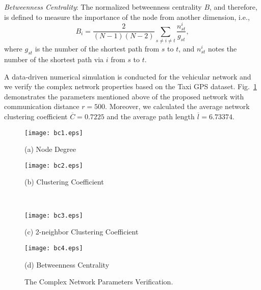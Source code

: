 \documentclass[journal,12pt,draftclsnofoot,onecolumn]{IEEEtran}
\begin{document}
\emph{Betweenness Centrality}: The normalized betweenness centrality $B$, and therefore, is defined to measure the importance of the node from another dimension, i.e.,
\begin{equation}\label{19}
{B_{i}}=\frac{2}{(N-1)(N-2)}\sum\limits_{s\ne i\ne t}{\frac{n_{st}^{i}}{{{g}_{st}}}},
\end{equation}
where ${{g}_{st}}$ is the number of the shortest path from $s$ to $t$, and $n_{st}^{i}$ notes the number of the shortest path via $i$ from $s$ to $t$.

A data-driven numerical simulation is conducted for the vehicular network and we verify the complex network properties based on the Taxi GPS dataset. Fig.~\ref{cc_bc} demonstrates the parameters mentioned above of the proposed network with communication distance $r=500$. Moreover, we calculated the average network clustering coefficient $\overline{C}=0.7225$ and the average path length $\overline{l}=6.73374$.


\begin{figure}[!t]
  \begin{minipage}[t]{0.46\linewidth}
  \centering
  \texttt{[image: bc1.eps]}
  \centerline{\footnotesize{(a) Node Degree}}
  \end{minipage}
  \begin{minipage}[t]{0.46\linewidth}
  \centering
  \texttt{[image: bc2.eps]}
  \centerline{\footnotesize{(b) Clustering Coefficient}}
  \end{minipage} \\
  \begin{minipage}[t]{0.46\linewidth}
  \centering
  \texttt{[image: bc3.eps]}
  \centerline{\footnotesize{(c) 2-neighbor Clustering Coefficient}}
  \end{minipage}
  \begin{minipage}[t]{0.46\linewidth}
  \centering
  \texttt{[image: bc4.eps]}
  \centerline{\footnotesize{(d) Betweenness Centrality}}
  \end{minipage}
\caption{The Complex Network Parameters Verification.}\label{cc_bc}
\vspace{-4mm}
\end{figure}
\end{document}
